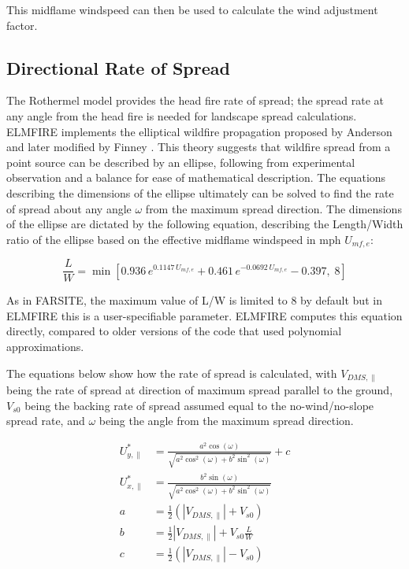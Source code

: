 This midflame windspeed can then be used to calculate the wind adjustment factor. 

\subsection{Directional Rate of Spread}

The Rothermel model provides the head fire rate of spread; the spread rate at any angle from the head fire is needed for landscape spread calculations. ELMFIRE implements the elliptical wildfire propagation proposed by Anderson \cite{andersonPredictingWinddrivenWind1983} and later modified by Finney \cite{finneyFARSITEFireArea1994}. This theory suggests that wildfire spread from a point source can be described by an ellipse, following from experimental observation and a balance for ease of mathematical description. The equations describing the dimensions of the ellipse ultimately can be solved to find the rate of spread about any angle $\omega$ from the maximum spread direction. The dimensions of the ellipse are dictated by the following equation, describing the Length/Width ratio of the ellipse based on the effective midflame windspeed in mph $U_{mf,e}$:

\begin{equation}
    \frac{L}{W} = \min \left[ 
0.936\, e^{0.1147\, U_{mf,e}} 
+ 0.461\, e^{-0.0692\, U_{mf,e}} 
- 0.397,\; 8
\right]
\end{equation}

As in FARSITE, the maximum value of L/W is limited to 8 by default but in ELMFIRE this is a user-specifiable parameter. ELMFIRE computes this equation directly, compared to older versions of the code that used polynomial approximations.

The equations below show how the rate of spread is calculated, with $V_{DMS,\parallel}$ being the rate of spread at direction of maximum spread parallel to the ground, $V_{s0}$ being the backing rate of spread assumed equal to the no-wind/no-slope spread rate, and $\omega$ being the angle from the maximum spread direction.

\begin{align}
U^{*}_{y,\parallel} &= 
\frac{a^{2}\cos(\omega)}{\sqrt{a^{2}\cos^{2}(\omega) + b^{2}\sin^{2}(\omega)}} + c \\[1em]
U^{*}_{x,\parallel} &=
\frac{b^{2}\sin(\omega)}{\sqrt{a^{2}\cos^{2}(\omega) + b^{2}\sin^{2}(\omega)}} \\[1em]
a &= \frac{1}{2}\left( \left| V_{DMS,\parallel} \right| + V_{s0} \right) \\[0.5em]
b &= \frac{1}{2} \left| V_{DMS,\parallel} \right| + V_{s0} \frac{L}{W} \\[0.5em]
c &= \frac{1}{2}\left( \left| V_{DMS,\parallel} \right| - V_{s0} \right)
\end{align}

